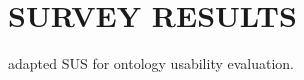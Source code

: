 \chapter{SURVEY RESULTS}
\cite{casellas2009ontology} adapted SUS for ontology usability evaluation.
